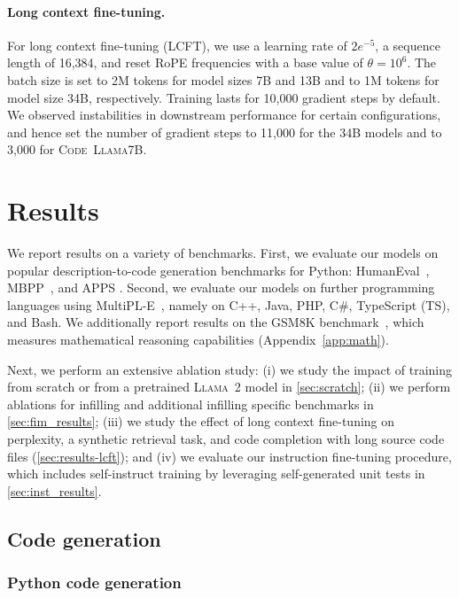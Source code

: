 \paragraph{Long context fine-tuning.} For long context fine-tuning (LCFT), we use a learning rate of $2e^{-5}$, a sequence length of 16,384, and reset RoPE frequencies with a base value of $\theta=10^6$.
The batch size is set to 2M tokens for model sizes 7B and 13B and to 1M tokens for model size 34B, respectively. Training lasts for 10,000 gradient steps by default. We observed instabilities in downstream performance for certain configurations, and hence set the number of gradient steps to 11,000 for the 34B models and to 3,000 for \textsc{Code~Llama}7B.

\section{Results}\label{sec:results}
We report results on a variety of benchmarks. First, we evaluate our models on popular description-to-code generation benchmarks for Python: HumanEval~\citep{chen2021evaluating},  MBPP~\citep{austin2021program}, and APPS \citep[programming interviews and competitions,][]{hendrycks2021measuring}. Second, we evaluate our models on further programming languages using MultiPL-E~\citep{cassano2022multiple}, namely on C++, Java, PHP, C\#, TypeScript (TS), and Bash. We additionally report results on the GSM8K benchmark~\citep{cobbe2021training}, which measures mathematical reasoning capabilities (Appendix~\ref{app:math}).

Next, we perform an extensive ablation study: (i) we study the impact of training from scratch or from a pretrained \textsc{Llama~2} model in \ref{sec:scratch}; (ii) we perform ablations for infilling and additional infilling specific benchmarks in \ref{sec:fim_results}; (iii) we study the effect of long context fine-tuning on perplexity, a synthetic retrieval task, and code completion with long source code files (\ref{sec:results-lcft}); and (iv) we evaluate our instruction fine-tuning procedure, which includes self-instruct training by leveraging self-generated unit tests in \ref{sec:inst_results}.

\subsection{Code generation}

\subsubsection{Python code generation}
\label{sec:python_evals}

